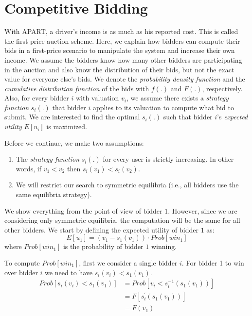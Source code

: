 \section{Competitive Bidding}
\label{sec:bidding}

With APART, a driver's income is as much as his reported cost. This is called the first-price auction scheme. Here, we explain how bidders can compute their bids in a first-price scenario to manipulate the system and increase their own income. We assume the bidders know how many other bidders are participating in the auction and also know the distribution of their bids, but not the exact value for everyone else's bids. We denote the \emph{probability density function} and the \emph{cumulative distribution function} of the bids with $f(.)$ and $F(.)$, respectively. Also, for every bidder $i$ with valuation $v_i$, we assume there exists a \emph{strategy function} $s_i(.)$ that bidder $i$ applies to its valuation to compute what bid to submit. We are interested to find the optimal $s_i(.)$ such that bidder $i$'s \emph{expected utility} $E[u_i]$ is maximized.

Before we continue, we make two assumptions:
\begin{enumerate}
\item The \emph{strategy function} $s_i(.)$ for every user is strictly increasing. In other words, if $v_1 < v_2$ then $s_i(v_1) < s_i(v_2)$.
\item We will restrict our search to symmetric equilibria (i.e., all bidders use the same equilibria strategy).
\end{enumerate}

We show everything from the point of view of bidder $1$. However, since we are considering only symmetric equilibria, the computation will be the same for all other bidders. We start by defining the expected utility of bidder $1$ as:
\begin{equation}
\label{eq:utility1}
E[u_1] = \left(v_1 - s_1\left( v_1 \right) \right) \cdot Prob \left[win_1\right] 
\end{equation}
where $Prob\left[win_1\right]$ is the probability of bidder $1$ winning.

To compute $Prob\left[win_1\right]$, first we consider a single bidder $i$. For bidder 1 to win over bidder $i$ we need to have $s_i(v_i) < s_1(v_1)$.
\begin{align*}
Prob\left[s_i(v_i) < s_1(v_1)\right] &= Prob\left[v_i < s_i^{-1}\left(s_1\left(v_1\right)\right)\right]\\
&=F\left[ s_i^\prime\left(s_1\left(v_1\right)\right)\right]\\
&=F(v_1)
\end{align*}

